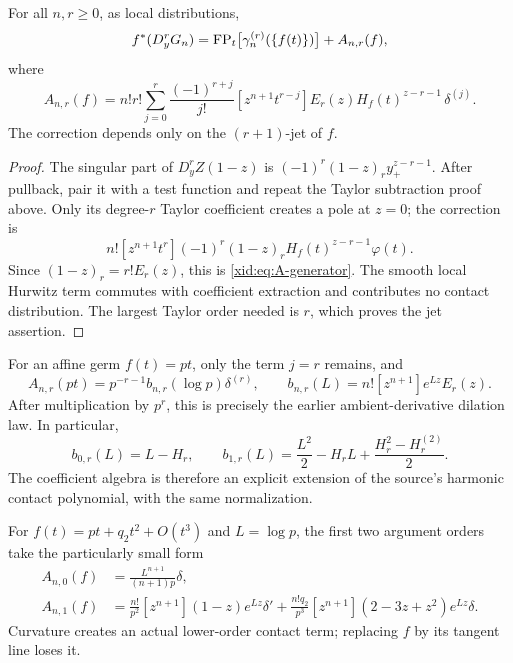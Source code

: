 \begin{theorem}
\label{xid:thm:stieltjes-nonlinear}
For all $n,r\ge0$, as local distributions,
\begin{equation}\label{xid:eq:stieltjes-nonlinear}
 f^*(D_y^rG_n)
 =\operatorname{FP}_t\bigl[\gamma_n^{(r)}(\{f(t)\})\bigr]
       +A_{n,r}(f),
\end{equation}
where
\begin{equation}\label{xid:eq:A-generator}
 A_{n,r}(f)=n!r!\sum_{j=0}^r\frac{(-1)^{r+j}}{j!}
 [z^{n+1}t^{r-j}]
 E_r(z)H_f(t)^{z-r-1}\,\delta^{(j)}.
\end{equation}
The correction depends only on the $(r+1)$-jet of $f$.
\end{theorem}

\begin{proof}
The singular part of $D_y^r Z(1-z)$ is
$(-1)^r(1-z)_r y_+^{z-r-1}$.  After pullback, pair it with a test
function and repeat the Taylor subtraction proof above.  Only its
degree-$r$ Taylor coefficient creates a pole at $z=0$; the correction
is
\[
 n![z^{n+1}t^r](-1)^r(1-z)_r
                  H_f(t)^{z-r-1}\varphi(t).
\]
Since $(1-z)_r=r!E_r(z)$, this is \eqref{xid:eq:A-generator}.
The smooth local Hurwitz term commutes with coefficient extraction
and contributes no contact distribution.  The largest Taylor order
needed is $r$, which proves the jet assertion.
\end{proof}

For an affine germ $f(t)=pt$, only the term $j=r$ remains, and
\begin{equation}\label{xid:eq:A-affine}
 A_{n,r}(pt)=p^{-r-1}b_{n,r}(\log p)\delta^{(r)},\qquad
 b_{n,r}(L)=n![z^{n+1}]e^{Lz}E_r(z).
\end{equation}
After multiplication by $p^r$, this is precisely the earlier
ambient-derivative dilation law.  In particular,
\[
 b_{0,r}(L)=L-H_r,\qquad
 b_{1,r}(L)=\frac{L^2}{2}-H_rL+
                    \frac{H_r^2-H_r^{(2)}}2.
\]
The coefficient algebra is therefore an explicit extension of the
source's harmonic contact polynomial, with the same normalization.

For $f(t)=pt+q_2t^2+O(t^3)$ and $L=\log p$, the first two argument
orders take the particularly small form
\begin{align}
 A_{n,0}(f)&=\frac{L^{n+1}}{(n+1)p}\delta,\label{xid:eq:A0}\\
 A_{n,1}(f)&=\frac{n!}{p^2}[z^{n+1}](1-z)e^{Lz}\delta'
 +\frac{n!q_2}{p^3}[z^{n+1}](2-3z+z^2)e^{Lz}\delta.
 \label{xid:eq:A1}
\end{align}
Curvature creates an actual lower-order contact term; replacing $f$
by its tangent line loses it.

